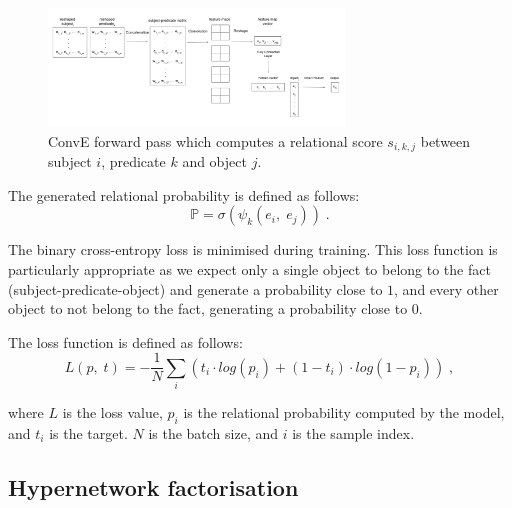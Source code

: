 \begin{figure}[H]
   	\centering
    	\includegraphics[width=0.7\textwidth, height=0.4\textwidth]{convolutional_entity_representations_final}
	\caption{ConvE forward pass which computes a relational score $ s_{i,k,j} $ between subject $ i $, predicate $ k $ and object $ j $.}
\end{figure}

\newpage

\noindent The generated relational probability is defined as follows: 
\begin{equation}
	\mathbb{P} = \sigma(\psi_k(e_i, \; e_j)) \; .
\end{equation}

\noindent The binary cross-entropy loss is minimised during training. This loss function is particularly appropriate as we expect only a single object to belong to the fact (subject-predicate-object) and generate a probability close to $ 1 $, and every other object to not belong to the fact, generating a probability close to $ 0 $. \par

\noindent The loss function is defined as follows:
\begin{equation}
	L(p, \; t) =  -\frac{1}{N}\sum_i(t_i \cdot log(p_i) + (1 - t_i) \cdot log(1 - p_i)) \; ,
\end{equation}

\noindent where $ L $ is the loss value, $ p_i $ is the relational probability computed by the model, and $ t_i $ is the target. $ N $ is the batch size, and $ i $ is the sample index.




\subsection{Hypernetwork factorisation}

